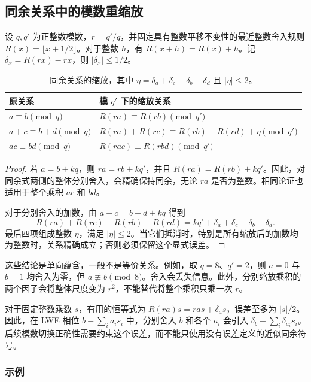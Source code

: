 
\subsection{同余关系中的模数重缩放}
\label{subsec:modulo-rescaling}

设 $q,q'$ 为正整数模数，$r=q'/q$，并固定具有整数平移不变性的最近整数舍入规则 $R(x)=\lfloor x+1/2\rfloor$。对于整数 $h$，有 $R(x+h)=R(x)+h$。记 $\delta_x=R(rx)-rx$，则 $|\delta_x|\le1/2$。

\begin{table}[h!]
\centering
\begin{tabular}{|l|l|}
\hline
原关系 & 模 $q'$ 下的缩放关系 \\
\hline
$a\equiv b\pmod q$ & $R(ra)\equiv R(rb)\pmod{q'}$ \\
$a+c\equiv b+d\pmod q$ & $R(ra)+R(rc)\equiv R(rb)+R(rd)+\eta\pmod{q'}$ \\
$ac\equiv bd\pmod q$ & $R(rac)\equiv R(rbd)\pmod{q'}$ \\
\hline
\end{tabular}
\caption{同余关系的缩放，其中 $\eta=\delta_a+\delta_c-\delta_b-\delta_d$ 且 $|\eta|\le2$。}
\label{tab:rescaling}
\end{table}

\begin{proof}
若 $a=b+kq$，则 $ra=rb+kq'$，并且 $R(ra)=R(rb)+kq'$。因此，对同余式两侧的整体分别舍入，会精确保持同余，无论 $ra$ 是否为整数。相同论证也适用于整个乘积 $ac$ 和 $bd$。

对于分别舍入的加数，由 $a+c=b+d+kq$ 得到
\[
R(ra)+R(rc)-R(rb)-R(rd)=kq'+\delta_a+\delta_c-\delta_b-\delta_d.
\]
最后四项组成整数 $\eta$，满足 $|\eta|\le2$。当它们抵消时，特别是所有缩放后的加数均为整数时，关系精确成立；否则必须保留这个显式误差。
\end{proof}

这些结论是单向蕴含，一般不是等价关系。例如，取 $q=8$、$q'=2$，则 $a=0$ 与 $b=1$ 均舍入为零，但 $a\not\equiv b\pmod8$。舍入会丢失信息。此外，分别缩放乘积的两个因子会将整体尺度变为 $r^2$，不能替代将整个乘积只乘一次 $r$。

对于固定整数乘数 $s$，有用的恒等式为 $R(ra)s=ras+\delta_a s$，误差至多为 $|s|/2$。因此，在 LWE 相位 $b-\sum_i a_i s_i$ 中，分别舍入 $b$ 和各个 $a_i$ 会引入 $\delta_b-\sum_i\delta_{a_i}s_i$。后续模数切换正确性需要约束这个误差，而不能只使用没有误差定义的近似同余符号。

\subsubsection{示例}
\label{subsec:modulo-rescaling-ex}

